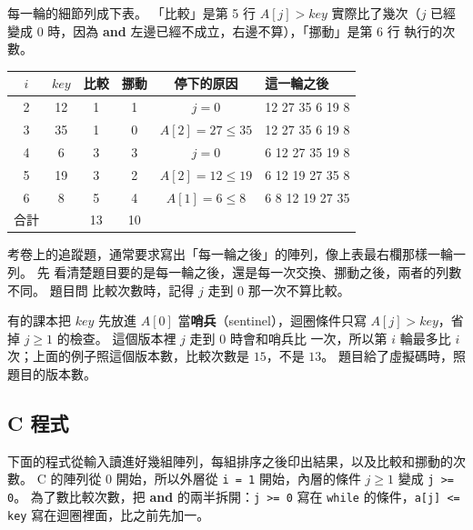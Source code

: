 每一輪的細節列成下表。 「比較」是第 5 行 $A[j] > \mathit{key}$ 實際比了幾次（$j$
已經變成 $0$ 時，因為 \textbf{and} 左邊已經不成立，右邊不算），「挪動」是第 6 行
執行的次數。

\begin{center}
\begin{tabular}{cccccl}
\toprule
$i$ & $\mathit{key}$ & 比較 & 挪動 & 停下的原因 & 這一輪之後 \\
\midrule
2 & 12 & 1 & 1 & $j = 0$ & 12 27 35 6 19 8 \\
3 & 35 & 1 & 0 & $A[2] = 27 \le 35$ & 12 27 35 6 19 8 \\
4 & 6 & 3 & 3 & $j = 0$ & 6 12 27 35 19 8 \\
5 & 19 & 3 & 2 & $A[2] = 12 \le 19$ & 6 12 19 27 35 8 \\
6 & 8 & 5 & 4 & $A[1] = 6 \le 8$ & 6 8 12 19 27 35 \\
\midrule
合計 & & 13 & 10 & & \\
\bottomrule
\end{tabular}
\end{center}

\begin{examnote}
考卷上的追蹤題，通常要求寫出「每一輪之後」的陣列，像上表最右欄那樣一輪一列。 先
看清楚題目要的是每一輪之後，還是每一次交換、挪動之後，兩者的列數不同。 題目問
比較次數時，記得 $j$ 走到 $0$ 那一次不算比較。

有的課本把 $\mathit{key}$ 先放進 $A[0]$ 當\textbf{哨兵}（sentinel），迴圈條件只寫
$A[j] > \mathit{key}$，省掉 $j \ge 1$ 的檢查。 這個版本裡 $j$ 走到 $0$ 時會和哨兵比
一次，所以第 $i$ 輪最多比 $i$ 次；上面的例子照這個版本數，比較次數是 $15$，不是
$13$。 題目給了虛擬碼時，照題目的版本數。
\end{examnote}

\subsection{C 程式}

下面的程式從輸入讀進好幾組陣列，每組排序之後印出結果，以及比較和挪動的次數。
C 的陣列從 $0$ 開始，所以外層從 \texttt{i = 1} 開始，內層的條件 $j \ge 1$ 變成
\texttt{j >= 0}。 為了數比較次數，把 \textbf{and} 的兩半拆開：\texttt{j >= 0}
寫在 \texttt{while} 的條件，\texttt{a[j] <= key} 寫在迴圈裡面，比之前先加一。

